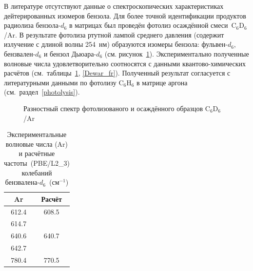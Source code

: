 {В литературе отсутствуют данные о спектроскопических характеристиках дейтерированных изомеров бензола. Для более точной идентификации продуктов радиолиза бензола-$d_6$ в матрицах был проведён фотолиз осаждённой смеси~C$_6$D$_6$/Ar.
В результате фотолиза ртутной лампой среднего давления (содержит излучение с длиной волны 254~нм) образуются изомеры бензола: фульвен\nobreakdash-$d_6$, бензвален\nobreakdash-$d_6$ и бензол Дьюара\nobreakdash-$d_6$ (см. рисунок~\ref{diff}). Экспериментально полученные волновые числа удовлетворительно соотносятся с данными квантово-химических расчётов (см.~таблицы~\ref{benz_fr}, \ref{Dewar_fr}).  Полученный результат согласуется с литературными данными по фотолизу C$_6$H$_6$ в матрице аргона (см.~раздел~\ref{photolysis}).  

 \begin{figure}[H]
\caption{Разностный спектр фотолизованого и осаждённого образцов C$_6$D$_6$/Ar}
\label{diff}
\end{figure}

 \begin{table}[H]
\caption{Экспериментальные волновые числа (Ar) и расчётные частоты~(PBE/L2\_3) колебаний бензвалена-$d_6$~(см$^{-1}$)}
\label{benz_fr}
\begin{center}
\begin{tabular}{cc}
Ar &  Расчёт \\
\hline
612.4 & 608.5\\
614.7 & \\
640.6 & 640.7\\
642.7 & \\
780.4 & 770.5\\
\end{tabular}
\end{center}
\end{table}

}
